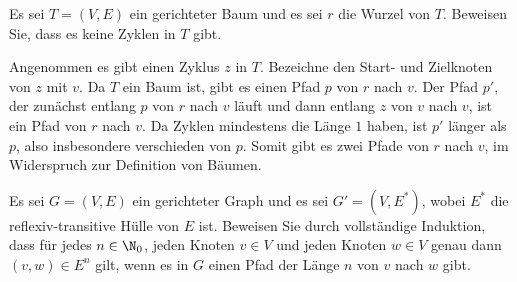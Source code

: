 \documentclass[12pt]{article}
\begin{document}


\begin{aufgabe}[4]
  Es sei $T = (V, E)$ ein gerichteter Baum und es sei $r$ die Wurzel von $T$. Beweisen Sie, dass es keine Zyklen in $T$ gibt.
\end{aufgabe}

\begin{loesung}
  Angenommen es gibt einen Zyklus $z$ in $T$. Bezeichne den Start- und Zielknoten von $z$ mit $v$. Da $T$ ein Baum ist, gibt es einen Pfad $p$ von $r$ nach $v$. Der Pfad $p'$, der zunächst entlang $p$ von $r$ nach $v$ läuft und dann entlang $z$ von $v$ nach $v$, ist ein Pfad von $r$ nach $v$. Da Zyklen mindestens die Länge $1$ haben, ist $p'$ länger als $p$, also insbesondere verschieden von $p$. Somit gibt es zwei Pfade von $r$ nach $v$, im Widerspruch zur Definition von Bäumen.
\end{loesung}


\begin{aufgabe}[4]
  Es sei $G = (V, E)$ ein gerichteter Graph und es sei $G' = (V, E^*)$, wobei $E^*$ die reflexiv-transitive Hülle von $E$ ist. Beweisen Sie durch vollständige Induktion, dass für jedes $n \in \N_0$, jeden Knoten $v \in V$ und jeden Knoten $w \in V$ genau dann $(v, w) \in E^n$ gilt, wenn es in $G$ einen Pfad der Länge $n$ von $v$ nach $w$ gibt. %
\end{aufgabe}
\end{document}
